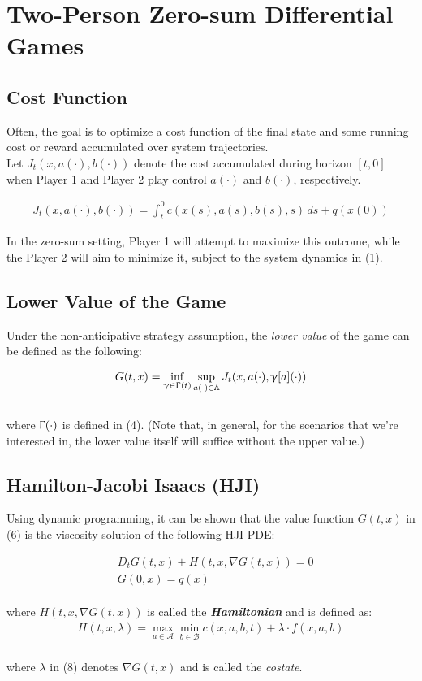 \documentclass{article}
\begin{document}
\section{Two-Person Zero-sum Differential Games}

\subsection{Cost Function}
\quad Often, the goal is to optimize a cost function of the final state and some running cost or reward accumulated over system trajectories.\\
\quad Let $J_t(x, a(\cdot), b(\cdot))$ denote the cost accumulated during horizon $[t,0]$ when Player 1 and Player 2 play control $a(\cdot)$ and $b(\cdot)$, respectively.

\begin{align}
    J_t(x, a(\cdot), b(\cdot)) = \int_{t}^{0} c(x(s), a(s), b(s), s) \, ds + q(x(0))
\end{align}

In the zero-sum setting, Player 1 will attempt to maximize this outcome, while the Player 2 will aim to minimize it, subject to the system dynamics in (1).

\subsection{Lower Value of the Game}
\quad Under the non-anticipative strategy assumption, the \textit{lower value} of the game can be defined as the following:

\begin{align}
    G(t,x) = \inf_{\upgamma \in \Upgamma(t)} \sup_{a(\cdot) \in \mathbb{A}} J_t(x, a(\cdot), \upgamma[a](\cdot))
\end{align}
\\
where $\Upgamma(\cdot)$ is defined in (4). (Note that, in general, for the scenarios that we're interested in, the lower value itself will suffice without the upper value.)

\subsection{Hamilton-Jacobi Isaacs (HJI)}
Using dynamic programming, it can be shown that the value function $G(t,x)$ in (6) is the viscosity solution of the following HJI PDE:

\begin{equation}
    \begin{aligned}
    & D_tG(t,x) + H(t,x,\nabla G(t,x)) = 0 \\
    & G(0,x) = q(x)
    \end{aligned}
\end{equation}
\\
where $H(t,x, \nabla G(t,x))$ is called the \textit{\textbf{Hamiltonian}} and is defined as:
\begin{align}
    H(t,x,\lambda) = \max_{a \in \mathcal{A}} \min_{b \in \mathcal{B}} c(x,a,b,t) + \lambda \cdot f(x,a,b)
\end{align}
\\
where $\lambda$ in (8) denotes $\nabla G(t,x)$ and is called the \textit{costate}.
\end{document}
